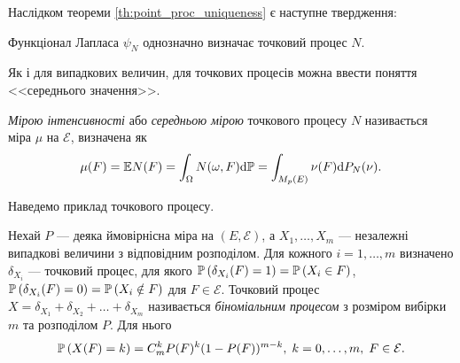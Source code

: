 Наслідком теореми \ref{th:point_proc_uniqueness} є наступне твердження:
\begin{theorem}
    Функціонал Лапласа $\psi_N$ однозначно визначає точковий процес $N$.
\end{theorem}

Як і для випадкових величин, для
точкових процесів можна ввести поняття <<середнього значення>>.
\begin{definition}
    \emph{Мірою інтенсивності} або \emph{середньою мірою} точкового процесу $N$
    називається міра $\mu$ на $\mathcal{E}$, визначена як
    $$
        \mu(F) = \E N(F) = \int_{\Omega} N(\omega, F) \d\mathbb{P} = 
        \int_{M_p(E)} \nu(F) \d P_N (\nu).
    $$
\end{definition}

Наведемо приклад точкового процесу.
\begin{definition}
    Нехай $P$ --- деяка ймовірнісна міра на $\left(E, \mathcal{E}\right)$, а
    $X_1, \dots, X_m$ --- незалежні випадкові величини з відповідним розподілом.
    Для кожного $i = 1, \dots, m$ визначено $\delta_{X_i}$ --- точковий процес,
    для якого $\P{\delta_{X_i}(F) = 1} = \P{X_i \in F}$,
    $\P{\delta_{X_i}(F) = 0} = \P{X_i \notin F}$ для $F \in \mathcal{E}$.
    Точковий процес $X = \delta_{X_1} + \delta_{X_2} + \dots + \delta_{X_m}$
    називається \emph{біноміальним процесом}
    з розміром вибірки $m$ та розподілом $P$. Для нього
    $$
        \P{X(F) = k} = C_m^k P(F)^k (1 - P(F))^{m-k}, \; k = 0,\dots,m, \; F \in \mathcal{E}.
    $$
\end{definition}

